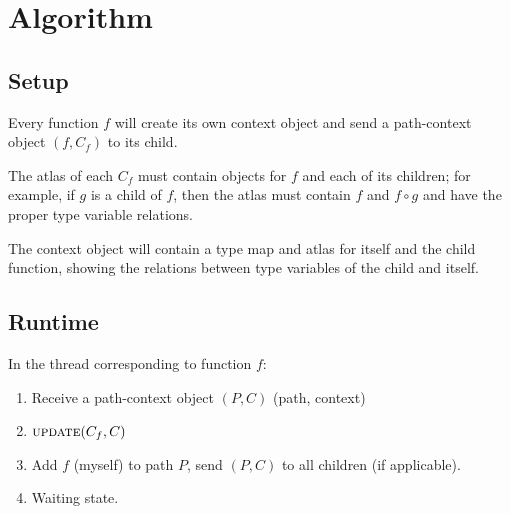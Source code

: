 \documentclass[10pt]{article}
\begin{document}
\pagebreak
\section{Algorithm}

\subsection{Setup}

Every function $f$ will create its own context object and send a path-context
object $(f, C_f)$ to its child.

The atlas of each $C_f$ must contain objects for $f$ and each of its
children; for example, if $g$ is a child of $f$, then the atlas must contain
$f$ and $f \circ g$ and have the proper type variable relations.

The context object will contain a type map and atlas for itself and the child
function, showing the relations between type variables of the child and itself.


\subsection{Runtime}

In the thread corresponding to function $f$:

\begin{enumerate}[noitemsep]
	\item  Receive a path-context object $(P, C)$ (path, context)


	\item $\Call{update}{C_f, C}$

	\item Add $f$ (myself) to path $P$, send $(P, C)$ to all children (if
		applicable).

	\item Waiting state.
\end{enumerate}

\end{document}
